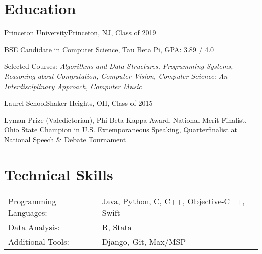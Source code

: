 \documentclass[12pt]{my_resume}
\begin{document}
\vspace{-6pt}

\section{Education}

\begin{resitem}{Princeton University}{Princeton, NJ, Class of 2019}
  \item BSE Candidate in Computer Science, Tau Beta Pi, GPA: 3.89 / 4.0
  \item Selected Courses: \textit{Algorithms and Data Structures, %
  Programming Systems, Reasoning about Computation, Computer Vision, %
  Computer Science: An Interdisciplinary Approach, Computer Music}
\end{resitem}

\vspace{-8pt}

\begin{resitem}{Laurel School}{Shaker Heights, OH, Class of 2015}
  \item Lyman Prize (Valedictorian), Phi Beta Kappa Award, %
  National Merit Finalist, Ohio State Champion in %
  U.S. Extemporaneous Speaking, Quarterfinalist at National Speech \& %
  Debate Tournament
\end{resitem}

\section{Technical Skills}

\vspace{-6pt}
\begin{tabular}{l l}%
Programming Languages: & Java, Python, C, C++, Objective-C++, Swift\\
Data Analysis: & R, Stata\\
Additional Tools: & Django, Git, Max/MSP\\
\end{tabular}

\end{document}
